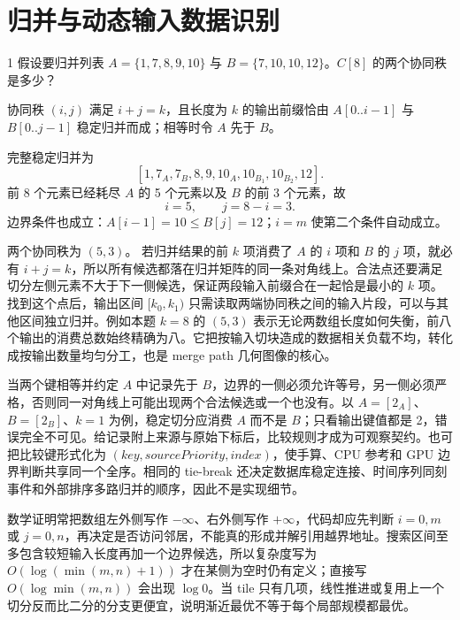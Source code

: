 \chapter{归并与动态输入数据识别}

\begin{solutionexercise}{1}
\problemheading 假设要归并列表
$A=\{1,7,8,9,10\}$ 与 $B=\{7,10,10,12\}$。$C[8]$ 的两个协同秩是多少？

\approachheading 协同秩 $(i,j)$ 满足 $i+j=k$，且长度为 $k$ 的输出前缀恰由
$A[0..i-1]$ 与 $B[0..j-1]$ 稳定归并而成；相等时令 $A$ 先于 $B$。

\answerheading 完整稳定归并为
\[
[1,7_A,7_B,8,9,10_A,10_{B_1},10_{B_2},12].
\]
前 8 个元素已经耗尽 $A$ 的 5 个元素以及 $B$ 的前 3 个元素，故
\[
 i=5,\qquad j=8-i=3.
\]
边界条件也成立：$A[i-1]=10\le B[j]=12$；$i=m$ 使第二个条件自动成立。

\conclusionheading 两个协同秩为 $\boxed{(5,3)}$。
\discussionheading
{}若归并结果的前 $k$ 项消费了 $A$ 的 $i$ 项和 $B$ 的 $j$ 项，就必有 $i+j=k$，所以所有候选都落在归并矩阵的同一条对角线上。合法点还要满足切分左侧元素不大于下一侧候选，保证两段输入前缀合在一起恰是最小的 $k$ 项。找到这个点后，输出区间 $[k_0,k_1)$ 只需读取两端协同秩之间的输入片段，可以与其他区间独立归并。例如本题 $k=8$ 的 $(5,3)$ 表示无论两数组长度如何失衡，前八个输出的消费总数始终精确为八。它把按输入切块造成的数据相关负载不均，转化成按输出数量均匀分工，也是 merge path 几何图像的核心。

当两个键相等并约定 $A$ 中记录先于 $B$，边界的一侧必须允许等号，另一侧必须严格，否则同一对角线上可能出现两个合法候选或一个也没有。以 $A=[2_A]$、$B=[2_B]$、$k=1$ 为例，稳定切分应消费 $A$ 而不是 $B$；只看输出键值都是 2，错误完全不可见。给记录附上来源与原始下标后，比较规则才成为可观察契约。也可把比较键形式化为 $(key,sourcePriority,index)$，使手算、CPU 参考和 GPU 边界判断共享同一个全序。相同的 tie-break 还决定数据库稳定连接、时间序列同刻事件和外部排序多路归并的顺序，因此不是实现细节。

数学证明常把数组左外侧写作 $-\infty$、右外侧写作 $+\infty$，代码却应先判断 $i=0,m$ 或 $j=0,n$，再决定是否访问邻居，不能真的形成并解引用越界地址。搜索区间至多包含较短输入长度再加一个边界候选，所以复杂度写为 $O(\!\log(\min(m,n)+1))$ 才在某侧为空时仍有定义；直接写 $O(\log\min(m,n))$ 会出现 $\log0$。当 tile 只有几项，线性推进或复用上一个切分反而比二分的分支更便宜，说明渐近最优不等于每个局部规模都最优。


\end{solutionexercise}

